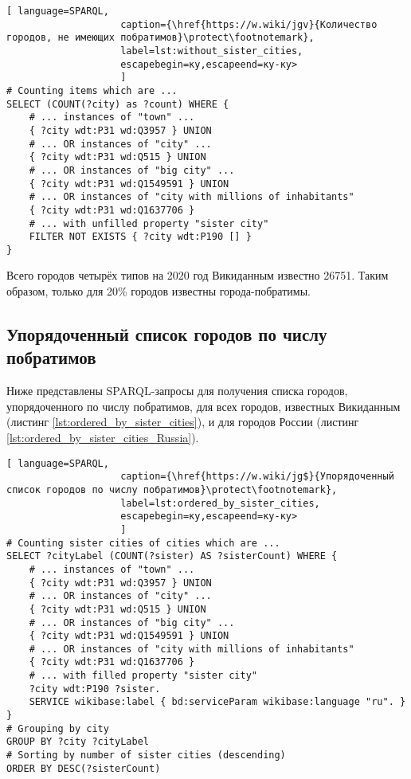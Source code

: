 \begin{lstlisting}[ language=SPARQL, 
                    caption={\href{https://w.wiki/jgv}{Количество городов, не имеющих побратимов}\protect\footnotemark},
                    label=lst:without_sister_cities, 
                    escapebegin=ку,escapeend=ку-ку>
                    ]
# Counting items which are ... 
SELECT (COUNT(?city) as ?count) WHERE {                             
	# ... instances of "town" ...
	{ ?city wdt:P31 wd:Q3957 } UNION 
	# ... OR instances of "city" ...                                 
	{ ?city wdt:P31 wd:Q515 } UNION    
	# ... OR instances of "big city" ...                               
	{ ?city wdt:P31 wd:Q1549591 } UNION   
	# ... OR instances of "city with millions of inhabitants"                            
	{ ?city wdt:P31 wd:Q1637706 } 
	# ... with unfilled property "sister city"                                    
	FILTER NOT EXISTS { ?city wdt:P190 [] }                           
}
\end{lstlisting}

Всего городов четырёх типов на 2020 год Викиданным известно \num{26751}. Таким образом, только для 20\% городов известны города-побратимы.

\subsection{Упорядоченный список городов по числу побратимов}

Ниже представлены SPARQL-запросы для получения списка городов, упорядоченного по числу побратимов, для всех городов, известных Викиданным (листинг \ref{lst:ordered_by_sister_cities}), и для городов России (листинг \ref{lst:ordered_by_sister_cities_Russia}).

\begin{lstlisting}[ language=SPARQL, 
                    caption={\href{https://w.wiki/jg$}{Упорядоченный список городов по числу побратимов}\protect\footnotemark},
                    label=lst:ordered_by_sister_cities, 
                    escapebegin=ку,escapeend=ку-ку>
                    ]
# Counting sister cities of cities which are ...
SELECT ?cityLabel (COUNT(?sister) AS ?sisterCount) WHERE {           
	# ... instances of "town" ...
	{ ?city wdt:P31 wd:Q3957 } UNION
	# ... OR instances of "city" ...                                   
	{ ?city wdt:P31 wd:Q515 } UNION
	# ... OR instances of "big city" ...                                   
	{ ?city wdt:P31 wd:Q1549591 } UNION 
	# ... OR instances of "city with millions of inhabitants"                               
	{ ?city wdt:P31 wd:Q1637706 }
	# ... with filled property "sister city"                                     
	?city wdt:P190 ?sister.                                            
	SERVICE wikibase:label { bd:serviceParam wikibase:language "ru". }
}
# Grouping by city
GROUP BY ?city ?cityLabel
# Sorting by number of sister cities (descending)                                   
ORDER BY DESC(?sisterCount)                                          
\end{lstlisting}

